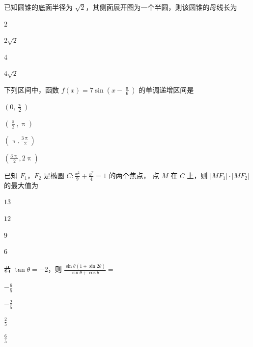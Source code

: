 \documentclass{exam-zh}
\begin{document}
\begin{question}
  已知圆锥的底面半径为 $\sqrt{2}$，其侧面展开图为一个半圆，则该圆锥的母线长为 \paren
  \begin{choices}
    \item $2$
    \item $2 \sqrt{2}$
    \item $4$
    \item $4 \sqrt{2}$
  \end{choices}
\end{question}

\begin{question}
  下列区间中，函数 $f(x) = 7 \sin \left( x - \frac{\uppi}{6} \right)$ 的单调递增区间是 \paren
  \begin{choices}
    \item $\left( 0               , \frac{\uppi}{2}  \right)$
    \item $\left( \frac{\uppi}{2} , \uppi            \right)$
    \item $\left( \uppi           , \frac{3\uppi}{2} \right)$
    \item $\left( \frac{3\uppi}{2}, 2\uppi           \right)$
  \end{choices}
\end{question}

\begin{question}
  已知 $F_1$，$F_2$ 是椭圆 $C \colon \frac{x^2}{9} + \frac{y^2}{4} = 1$ 的两个焦点，
  点 $M$ 在 $C$ 上，则 $|M F_1| \cdot |M F_2|$ 的最大值为 \paren
  \begin{choices}
    \item $13$
    \item $12$
    \item $9$
    \item $6$
  \end{choices}
\end{question}

\begin{question}
  若 $\tan\theta = -2$，则 $\frac{\sin\theta (1 + \sin 2\theta)}{\sin\theta + \cos\theta} = $ \paren
  \begin{choices}
    \item $-\frac{6}{5}$
    \item $-\frac{2}{5}$
    \item $\frac{2}{5}$
    \item $\frac{6}{5}$
  \end{choices}
\end{question}
\end{document}
